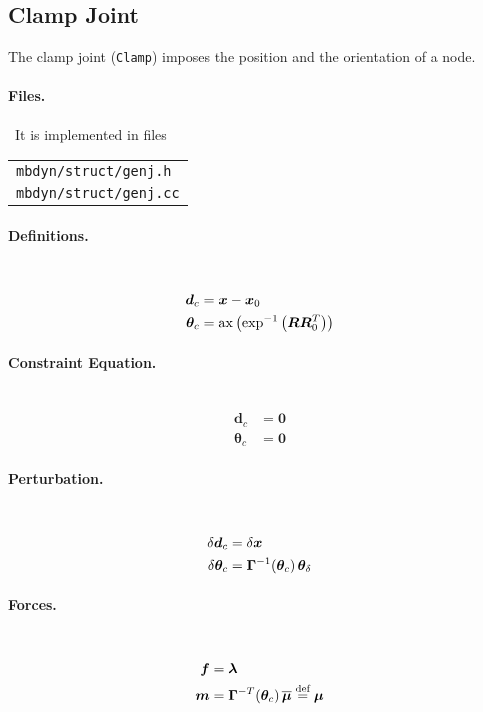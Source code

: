 \documentclass[10pt,dvips,fleqn,subeqn]{report}
\newcommand{\T}[1]{\bm{#1}}
\newcommand{\TT}[1]{\bm{#1}}
\begin{document}
\subsection{Clamp Joint}
\label{sec:ClampJoint}
The clamp joint (\texttt{Clamp}) imposes the position
and the orientation of a node.

\paragraph{Files.} \
It is implemented in files

\begin{tabular}{l}
\texttt{mbdyn/struct/genj.h} \\
\texttt{mbdyn/struct/genj.cc}
\end{tabular}

\paragraph{Definitions.} \
\begin{align}
	\T{d}_c &= \T{x} - \T{x}_0 \\
	\T{\theta}_c &= \mathrm{ax}\plbr{\mathrm{exp}^{-1}\plbr{\TT{R}\TT{R}_0^T}}
\end{align}

\paragraph{Constraint Equation.} \
\begin{align}
	\T{d}_c &= \T{0} \\
	\T{\theta}_c &= \T{0}
\end{align}

\paragraph{Perturbation.} \
\begin{align}
	\delta\T{d}_c &= \delta\T{x} \\
	\delta\T{\theta}_c &= \TT{\Gamma}^{-1}\!\plbr{\T{\theta}_c} \T{\theta}_{\delta}
\end{align}

\paragraph{Forces.} \
\begin{subequations}
\begin{align}
	\T{f} &= \T{\lambda} \\
	\T{m} &= \TT{\Gamma}^{-T}\!\plbr{\T{\theta}_c} \overline{\T{\mu}}
	\overset{\text{def}}{=} \T{\mu}
\end{align}
\end{subequations}
\end{document}
